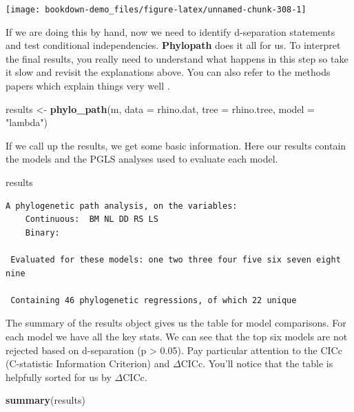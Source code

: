 \documentclass[
]{book}
\newenvironment{Shaded}{\begin{snugshade}}{\end{snugshade}}
\newcommand{\DataTypeTok}[1]{\textcolor[rgb]{0.13,0.29,0.53}{#1}}
\newcommand{\KeywordTok}[1]{\textcolor[rgb]{0.13,0.29,0.53}{\textbf{#1}}}
\newcommand{\NormalTok}[1]{#1}
\newcommand{\StringTok}[1]{\textcolor[rgb]{0.31,0.60,0.02}{#1}}
\begin{document}
\begin{center}\texttt{[image: bookdown-demo\_files/figure-latex/unnamed-chunk-308-1]} \end{center}

If we are doing this by hand, now we need to identify d-separation statements and test conditional independencies. \textbf{Phylopath} does it all for us. To interpret the final results, you really need to understand what happens in this step so take it slow and revisit the explanations above. You can also refer to the methods papers which explain things very well \citep{Hardenberg13, Gonzalez14}.

\begin{Shaded}
\begin{Highlighting}[]
\NormalTok{results \textless{}{-}}\StringTok{ }\KeywordTok{phylo\_path}\NormalTok{(m, }\DataTypeTok{data =}\NormalTok{ rhino.dat, }\DataTypeTok{tree =}\NormalTok{ rhino.tree, }\DataTypeTok{model =} \StringTok{"lambda"}\NormalTok{)}
\end{Highlighting}
\end{Shaded}

If we call up the results, we get some basic information. Here our results contain the models and the PGLS analyses used to evaluate each model.

\begin{Shaded}
\begin{Highlighting}[]
\NormalTok{results}
\end{Highlighting}
\end{Shaded}

\begin{verbatim}
A phylogenetic path analysis, on the variables:
    Continuous:  BM NL DD RS LS 
    Binary:       

 Evaluated for these models: one two three four five six seven eight nine 

 Containing 46 phylogenetic regressions, of which 22 unique
\end{verbatim}

The summary of the results object gives us the table for model comparisons. For each model we have all the key stats. We can see that the top six models are not rejected based on d-separation (p \textgreater{} 0.05). Pay particular attention to the CICc (C-statistic Information Criterion) and \(\Delta\)CICc. You'll notice that the table is helpfully sorted for us by \(\Delta\)CICc.

\begin{Shaded}
\begin{Highlighting}[]
\KeywordTok{summary}\NormalTok{(results)}
\end{Highlighting}
\end{Shaded}
\end{document}
